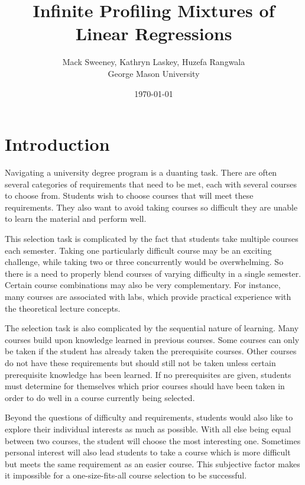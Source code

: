 \documentclass[10pt]{proc}
\title{Infinite Profiling Mixtures of Linear Regressions}
\author{
    Mack Sweeney, Kathryn Laskey, Huzefa Rangwala\\
        George Mason University
}
\date{\today}
\begin{document}
\maketitle


\begin{abstract}

\end{abstract}


\section{Introduction}

Navigating a university degree program is a duanting task. There are often
several categories of requirements that need to be met, each with several
courses to choose from. Students wish to choose courses that will meet these
requirements. They also want to avoid taking courses so difficult they are
unable to learn the material and perform well.

This selection task is complicated by the fact that students take multiple
courses each semester. Taking one particularly difficult course may be an
exciting challenge, while taking two or three concurrently would be
overwhelming. So there is a need to properly blend courses of varying difficulty
in a single semester. Certain course combinations may also be very
complementary. For instance, many courses are associated with labs, which
provide practical experience with the theoretical lecture concepts.

The selection task is also complicated by the sequential nature of learning.
Many courses build upon knowledge learned in previous courses. Some courses can
only be taken if the student has already taken the prerequisite courses. Other
courses do not have these requirements but should still not be taken unless
certain prerequisite knowledge has been learned. If no prerequisites are given,
students must determine for themselves which prior courses should have been
taken in order to do well in a course currently being selected.

Beyond the questions of difficulty and requirements, students would also like to
explore their individual interests as much as possible. With all else being
equal between two courses, the student will choose the most interesting one.
Sometimes personal interest will also lead students to take a course which is
more difficult but meets the same requirement as an easier course. This
subjective factor makes it impossible for a one-size-fits-all course selection
to be successful.
\end{document}
